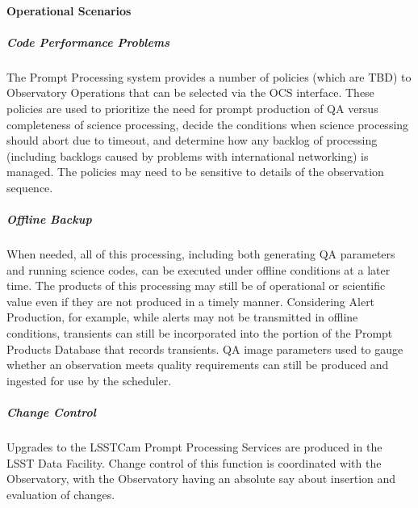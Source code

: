 \paragraph{Operational Scenarios}

\subparagraph{Code Performance Problems}
The Prompt Processing system
provides a number of policies (which are TBD) to Observatory
Operations that can be selected via the OCS interface.  These policies
are used to prioritize the need for prompt production of QA versus
completeness of science processing, decide the conditions when science
processing should abort due to timeout, and determine how any backlog
of processing (including backlogs caused by problems with
international networking) is managed.  The policies may need to be
sensitive to details of the observation sequence.

\subparagraph{Offline Backup}
When needed, all of this processing, including both generating QA
parameters and running science codes, can be executed under offline
conditions at a later time.  The products of
this processing may still be of operational or scientific value even
if they are not produced in a timely manner.  Considering Alert
Production, for example, while alerts may not be transmitted in
offline conditions, transients can still be incorporated into the
portion of the Prompt Products Database that records transients.  QA image
parameters used to gauge whether an observation meets quality
requirements can still be produced and ingested for use by the scheduler.

\subparagraph{Change Control}
Upgrades to the LSSTCam Prompt Processing Services are produced in the LSST Data Facility. Change control
of this function is coordinated with the Observatory, with the Observatory having an absolute say
about insertion and evaluation of changes.
